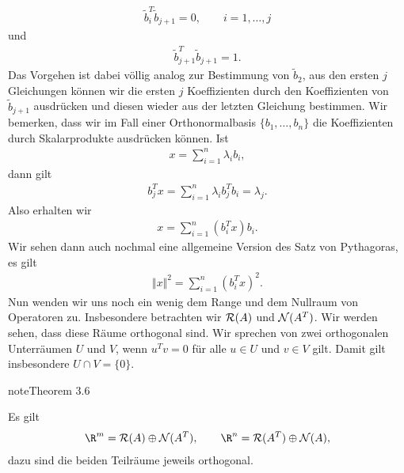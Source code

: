 \documentclass[letterpaper,10pt,english]{jupyterBook}
\begin{document}
\begin{equation*}
\begin{split} \tilde b_i^T \tilde b_{j+1} = 0, \qquad i=1,\ldots,j\end{split}
\end{equation*}
und
\begin{equation*}
\begin{split} \tilde b_{j+1}^T \tilde b_{j+1} = 1.\end{split}
\end{equation*}
Das Vorgehen ist dabei völlig analog zur Bestimmung von \(\tilde b_2\), aus den ersten \(j\) Gleichungen können wir die ersten \(j\) Koeffizienten durch den Koeffizienten von \(\tilde b_{j+1}\) ausdrücken und diesen wieder aus der letzten Gleichung bestimmen.
Wir bemerken, dass wir im Fall einer Orthonormalbasis \(\{b_1,\ldots,b_n\}\) die Koeffizienten durch Skalarprodukte ausdrücken können. Ist
\begin{equation*}
\begin{split} x = \sum_{i=1}^n \lambda_i b_i,\end{split}
\end{equation*}
dann gilt
\begin{equation*}
\begin{split} b_j^T x = \sum_{i=1}^n \lambda_i b_j^T b_i = \lambda_j.\end{split}
\end{equation*}
Also erhalten wir
\begin{equation*}
\begin{split} x= \sum_{i=1}^n (b_i^T x) b_i.\end{split}
\end{equation*}
Wir sehen dann auch nochmal eine allgemeine Version des Satz von Pythagoras, es gilt
\begin{equation*}
\begin{split} \Vert x \Vert^2 = \sum_{i=1}^n (b_i^T x)^2.\end{split}
\end{equation*}
Nun wenden wir uns noch ein wenig dem Range und dem Nullraum von Operatoren zu. Insbesondere betrachten wir \({\cal R}(A)\) und \({\cal N}(A^T)\). Wir werden sehen, dass diese Räume orthogonal sind. Wir sprechen von zwei orthogonalen Unterräumen \(U\) und \(V\), wenn \(u^T v = 0\) für alle \(u \in U\) und \(v \in V\) gilt. Damit gilt insbesondere \(U \cap V = \{0\}\).
\label{vektorraeume/LGS:theorem-5}
\begin{sphinxadmonition}{note}{Theorem 3.6}



Es gilt
\begin{equation*}
\begin{split} \R^m  = {\cal R}(A) \oplus {\cal N}(A^T), \qquad \R^n = {\cal R}(A^T) \oplus {\cal N}(A ),\end{split}
\end{equation*}
dazu sind die beiden Teilräume jeweils orthogonal.
\end{sphinxadmonition}
\end{document}
